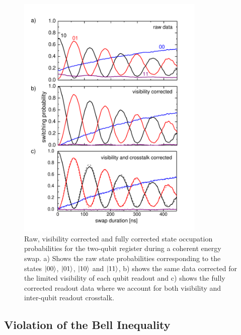 \begin{figure}[p!]
	\centering
	\includegraphics[width=0.8\textwidth]{"./material/papers/iswap/figures/swap_raw_and_corrected"}
	\caption[]{Raw, visibility corrected and fully corrected state occupation probabilities for the two-qubit register during a coherent energy swap. a) Shows the raw state probabilities corresponding to the states $\left| 00 \right>$, $\left| 01 \right>$, $\left| 10 \right>$ and $\left| 11 \right>$, b) shows the same data corrected for the limited visibility of each qubit readout and c) shows the fully corrected readout data where we account for both visibility and inter-qubit readout crosstalk.}
	\label{fig:swap_raw_and_corrected}
\end{figure}

\subsection{Violation of the Bell Inequality}

